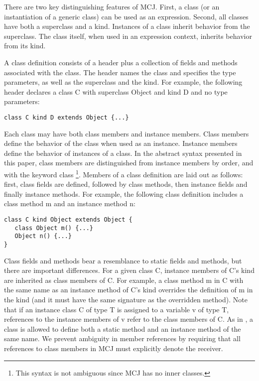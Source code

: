 \documentclass{acmconfbig}
\begin{document}
There are two key distinguishing features of MCJ. First, a class (or
an instantiation of a generic class) can be used as an expression.
Second, all classes have both a superclass and a kind. Instances of a
class inherit behavior from the superclass. The class itself, when
used in an expression context, inherits behavior from its kind.

A class definition consists of a header plus a collection of fields
and methods associated with the class.  The header names the class and
specifies the type parameters, as well as the superclass and the kind.
For example, the following header declares a class {\txt C} with
superclass {\txt Object} and kind {\txt D} and no type parameters:

\begin{verbatim}
class C kind D extends Object {...}
\end{verbatim}

Each class may have both class members and instance members. Class
members define the behavior of the class when used as an
instance. Instance members define the behavior of instances of a
class.  In the abstract syntax presented in this paper, class members
are distinguished from instance members by order, and with the keyword
{\txt class} \footnote{This syntax is not ambiguous since MCJ has no
inner classes.}.  Members of a class definition are laid out as
follows: first, class fields are defined, followed by class methods,
then instance fields and finally instance methods.  For example, the
following class definition includes a class method {\txt m} and an
instance method {\txt n}:

\begin{verbatim}
class C kind Object extends Object {
   class Object m() {...}
   Object n() {...}
}
\end{verbatim}

Class fields and methods bear a resemblance to static fields and
methods, but there are important differences. For a given class {\txt
C}, instance members of {\txt C}'s kind are inherited as class
members of {\txt C}. For example, a class method {\txt m} in {\txt C}
with the same name as an instance method of {\txt C}'s kind
overrides the definition of {\txt m} in the kind (and it must have the
same signature as the overridden method). Note that if an instance
class {\txt C} of type {\txt T} is assigned to a variable {\txt v} of
type {\txt T}, references to the instance members of {\txt v} refer to
the class members of {\txt C}.  As in \cite{DimUnits}, a class is
allowed to define both a static method and an instance method of the
same name. We prevent ambiguity in member references by requiring that
all references to class members in MCJ must explicitly denote the
receiver.
\end{document}
